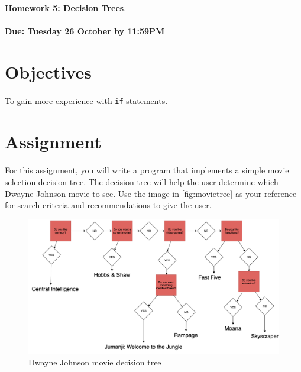 \documentclass[letter,11pt]{article}
\begin{document}
\huge
\textbf{Homework 5: Decision Trees}.
\normalsize
\\ ~~ \\
\textbf{Due: Tuesday 26 October by 11:59PM}

\section*{Objectives}
\paragraph{}To gain more experience with \texttt{if} statements.

\FloatBarrier
\section*{Assignment}
\paragraph{}For this assignment, you will write a program that implements a simple movie selection decision tree. The decision tree will help the user determine which Dwayne Johnson movie to see. Use the image in \autoref{fig:movietree} as your reference for search criteria and recommendations to give the user.

\begin{figure}[h!]
    \centering
    \includegraphics[scale=0.41]{Homework/Homework 05 - Dwayne Johnson Movie Decision Tree.png}
    \caption{Dwayne Johnson movie decision tree}
    \label{fig:movietree}
\end{figure}
\end{document}

